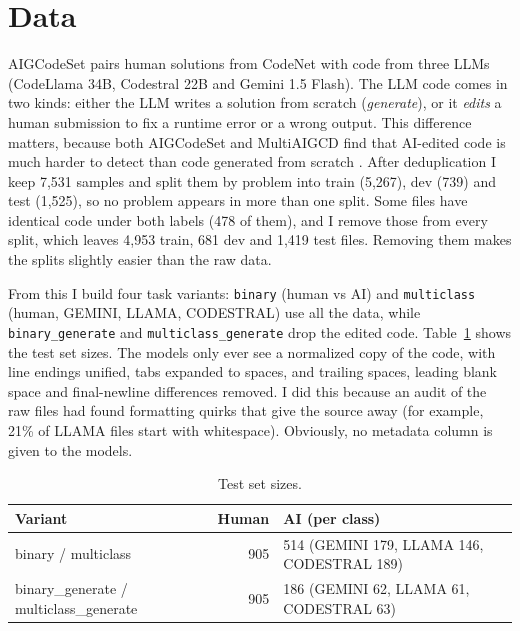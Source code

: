 \documentclass[11pt]{article}
\begin{document}
\section{Data}
\label{sec:data}

AIGCodeSet \citep{demirok-kutlu-2025-aigcodeset} pairs human solutions from CodeNet \citep{puri-etal-2021-codenet} with code from three LLMs (CodeLlama 34B, Codestral 22B and Gemini 1.5 Flash). The LLM code comes in two kinds: either the LLM writes a solution from scratch (\emph{generate}), or it \emph{edits} a human submission to fix a runtime error or a wrong output. This difference matters, because both AIGCodeSet and MultiAIGCD find that AI-edited code is much harder to detect than code generated from scratch \citep{demirok-kutlu-2025-aigcodeset,demirok-etal-2026-multiaigcd}. After deduplication I keep 7,531 samples and split them by problem into train (5,267), dev (739) and test (1,525), so no problem appears in more than one split. Some files have identical code under both labels (478 of them), and I remove those from every split, which leaves 4,953 train, 681 dev and 1,419 test files. Removing them makes the splits slightly easier than the raw data.

From this I build four task variants: \texttt{binary} (human vs AI) and \texttt{multiclass} (human, GEMINI, LLAMA, CODESTRAL) use all the data, while \texttt{binary\_generate} and \texttt{multiclass\_generate} drop the edited code. Table~\ref{tab:sizes} shows the test set sizes. The models only ever see a normalized copy of the code, with line endings unified, tabs expanded to spaces, and trailing spaces, leading blank space and final-newline differences removed. I did this because an audit of the raw files had found formatting quirks that give the source away (for example, 21\% of LLAMA files start with whitespace). Obviously, no metadata column is given to the models.

\begin{table}[t]
  \centering
  \small
  \begin{tabular}{lrl}
    \hline
    \textbf{Variant} & \textbf{Human} & \textbf{AI (per class)} \\
    \hline
    binary / multiclass                   & 905 & 514 (GEMINI 179, LLAMA 146, CODESTRAL 189) \\
    binary\_generate / multiclass\_generate & 905 & 186 (GEMINI 62, LLAMA 61, CODESTRAL 63) \\
    \hline
  \end{tabular}
  \caption{Test set sizes.}
  \label{tab:sizes}
\end{table}
\end{document}
